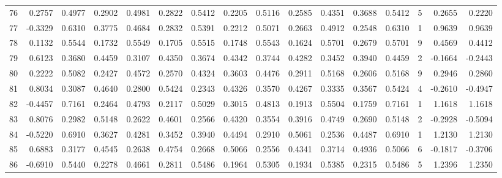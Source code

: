 \begin{tabular}{lrrrrrrrrrrrrrrr}
76  &      0.2757 &  0.4977 &  0.2902 &  0.4981 &  0.2822 &  0.5412 &  0.2205 &  0.5116 &  0.2585 &  0.4351 &   0.3688 &     0.5412 &      5 &                    0.2655 &                     0.2220 \\
77  &     -0.3329 &  0.6310 &  0.3775 &  0.4684 &  0.2832 &  0.5391 &  0.2212 &  0.5071 &  0.2663 &  0.4912 &   0.2548 &     0.6310 &      1 &                    0.9639 &                     0.9639 \\
78  &      0.1132 &  0.5544 &  0.1732 &  0.5549 &  0.1705 &  0.5515 &  0.1748 &  0.5543 &  0.1624 &  0.5701 &   0.2679 &     0.5701 &      9 &                    0.4569 &                     0.4412 \\
79  &      0.6123 &  0.3680 &  0.4459 &  0.3107 &  0.4350 &  0.3674 &  0.4342 &  0.3744 &  0.4282 &  0.3452 &   0.3940 &     0.4459 &      2 &                   -0.1664 &                    -0.2443 \\
80  &      0.2222 &  0.5082 &  0.2427 &  0.4572 &  0.2570 &  0.4324 &  0.3603 &  0.4476 &  0.2911 &  0.5168 &   0.2606 &     0.5168 &      9 &                    0.2946 &                     0.2860 \\
81  &      0.8034 &  0.3087 &  0.4640 &  0.2800 &  0.5424 &  0.2343 &  0.4326 &  0.3570 &  0.4267 &  0.3335 &   0.3567 &     0.5424 &      4 &                   -0.2610 &                    -0.4947 \\
82  &     -0.4457 &  0.7161 &  0.2464 &  0.4793 &  0.2117 &  0.5029 &  0.3015 &  0.4813 &  0.1913 &  0.5504 &   0.1759 &     0.7161 &      1 &                    1.1618 &                     1.1618 \\
83  &      0.8076 &  0.2982 &  0.5148 &  0.2622 &  0.4601 &  0.2566 &  0.4320 &  0.3554 &  0.3916 &  0.4749 &   0.2690 &     0.5148 &      2 &                   -0.2928 &                    -0.5094 \\
84  &     -0.5220 &  0.6910 &  0.3627 &  0.4281 &  0.3452 &  0.3940 &  0.4494 &  0.2910 &  0.5061 &  0.2536 &   0.4487 &     0.6910 &      1 &                    1.2130 &                     1.2130 \\
85  &      0.6883 &  0.3177 &  0.4545 &  0.2638 &  0.4754 &  0.2668 &  0.5066 &  0.2556 &  0.4341 &  0.3714 &   0.4936 &     0.5066 &      6 &                   -0.1817 &                    -0.3706 \\
86  &     -0.6910 &  0.5440 &  0.2278 &  0.4661 &  0.2811 &  0.5486 &  0.1964 &  0.5305 &  0.1934 &  0.5385 &   0.2315 &     0.5486 &      5 &                    1.2396 &                     1.2350 \\

\end{tabular}
